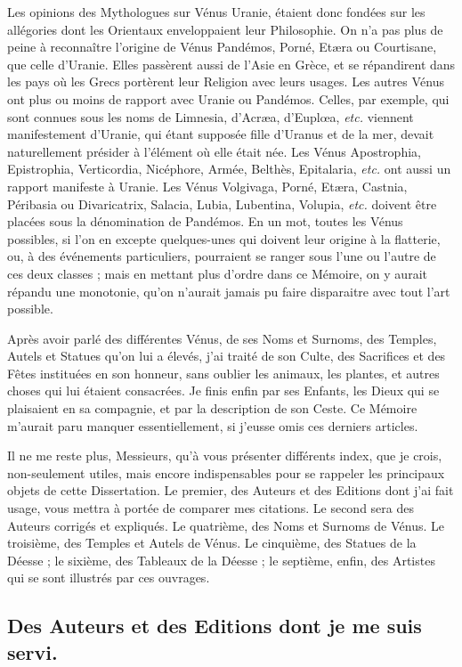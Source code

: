 \documentclass[a4paper, 18pt, oneside]{article}
\begin{document}
Les opinions des Mythologues sur Vénus Uranie, étaient donc fondées sur les allégories dont les Orientaux enveloppaient leur Philosophie. On n'a pas plus de peine à reconnaître l'origine de Vénus Pandémos, Porné, Etæra ou Courtisane, que celle d'Uranie. Elles passèrent aussi de l'Asie en Grèce, et se répandirent dans les pays où les Grecs portèrent leur Religion avec leurs usages. Les autres Vénus ont plus ou moins de rapport avec Uranie ou Pandémos. Celles, par exemple, qui sont connues sous les noms de Limnesia, d'Acræa, d'Euplœa, \emph{etc.} viennent manifestement d'Uranie, qui étant supposée fille d'Uranus et de la mer, devait naturellement présider à l'élément où elle était née. Les Vénus Apostrophia, Epistrophia, Verticordia, Nicéphore, Armée, Belthès, Epitalaria, \emph{etc.} ont aussi un rapport manifeste à Uranie. Les Vénus Volgivaga, Porné, Etæra, Castnia, Péribasia ou Divaricatrix, Salacia, Lubia, Lubentina, Volupia, \emph{etc.} doivent être placées sous la dénomination de Pandémos. En un mot, toutes les Vénus possibles, si l'on en excepte quelques-unes qui doivent leur origine à la flatterie, ou, à des événements particuliers, pourraient se ranger sous l'une ou l'autre de ces deux classes ; mais en mettant plus d'ordre dans ce Mémoire, on y aurait répandu une monotonie, qu'on n'aurait jamais pu faire disparaitre avec tout l'art possible.

Après avoir parlé des différentes Vénus, de ses Noms et Surnoms, des Temples, Autels et Statues qu'on lui a élevés, j'ai traité de son Culte, des Sacrifices et des Fêtes instituées en son honneur, sans oublier les animaux, les plantes, et autres choses qui lui étaient consacrées. Je finis enfin par ses Enfants, les Dieux qui se plaisaient en sa compagnie, et par la description de son Ceste. Ce Mémoire m'aurait paru manquer essentiellement, si j'eusse omis ces derniers articles.

Il ne me reste plus, Messieurs, qu'à vous présenter différents index, que je crois, non-seulement utiles, mais encore indispensables pour se rappeler les principaux objets de cette Dissertation. Le premier, des Auteurs et des Editions dont j'ai fait usage, vous mettra à portée de comparer mes citations. Le second sera des Auteurs corrigés et expliqués. Le quatrième, des Noms et Surnoms de Vénus. Le troisième, des Temples et Autels de Vénus. Le cinquième, des Statues de la Déesse ; le sixième, des Tableaux de la Déesse ; le septième, enfin, des Artistes qui se sont illustrés par ces ouvrages.
\clearpage
\subsection*{Des Auteurs et des Editions dont je me suis servi.}
\end{document}

